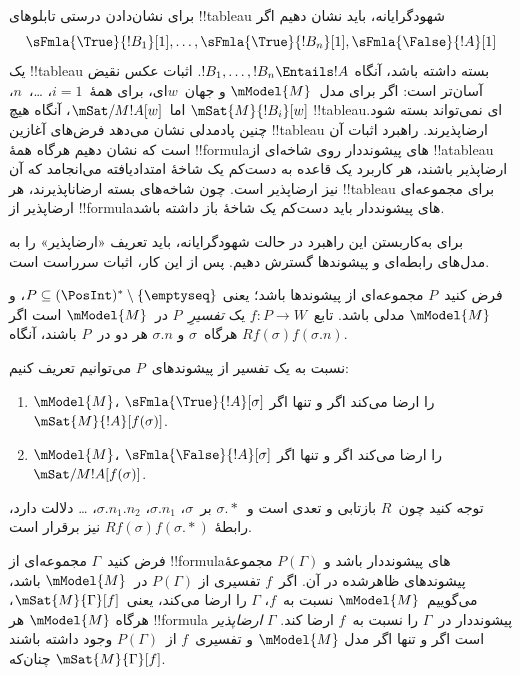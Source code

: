 \documentclass[../../../include/open-logic-section]{subfiles}
\begin{document}


\begin{explain}
  برای نشان‌دادن درستی تابلوهای !!{tableau} شهودگرایانه، باید نشان دهیم
  اگر
  \[
  \sFmla{\True}{!B_1}[1], \dots, \sFmla{\True}{!B_n}[1], \sFmla{\False}{!A}[1]
  \]
  یک !!{tableau} بسته داشته باشد، آنگاه
  $!B_1, \dots, !B_n \Entails !A$. اثبات عکس نقیض آسان‌تر است: اگر برای
  مدل~$\mModel{M}$ و جهان~$w$ای، برای همهٔ~$i=1$، \dots،~$n$،
  $\mSat{M}{!B_i}[w]$ اما~$\mSat/{M}{!A}[w]$، آنگاه هیچ
  !!{tableau}ای نمی‌تواند بسته شود. چنین پادمدلی نشان می‌دهد فرض‌های
  آغازین !!{tableau} ارضاپذیرند. راهبرد اثبات آن است که نشان دهیم هرگاه
  همهٔ !!{formula}های پیشونددار روی شاخه‌ای از !!a{tableau} ارضاپذیر
  باشند، هر کاربرد یک قاعده به دست‌کم یک شاخهٔ امتدادیافته می‌انجامد که
  آن نیز ارضاپذیر است. چون شاخه‌های بسته ارضاناپذیرند، هر !!{tableau}
  برای مجموعه‌ای ارضاپذیر از !!{formula}های پیشونددار باید دست‌کم یک
  شاخهٔ باز داشته باشد.

  برای به‌کاربستن این راهبرد در حالت شهودگرایانه، باید تعریف
  «ارضاپذیر» را به مدل‌های رابطه‌ای و پیشوندها گسترش دهیم. پس از این
  کار، اثبات سرراست است.
\end{explain}

\begin{defn}
  فرض کنید~$P$ مجموعه‌ای از پیشوندها باشد؛ یعنی
  $P \subseteq (\PosInt)^* \setminus \{\emptyseq\}$، و
  $\mModel{M}$ مدلی باشد. تابع~$f\colon P \to W$ یک
  \emph{تفسیرِ}~$P$ در~$\mModel{M}$ است اگر هرگاه~$\sigma$ و
  $\sigma.n$ هر دو در~$P$ باشند، آنگاه
  $Rf(\sigma)f(\sigma.n)$.

  نسبت به یک تفسیر از پیشوندهای~$P$ می‌توانیم تعریف کنیم:
  \begin{enumerate}
  \item $\mModel{M}$، $\sFmla{\True}{!A}[\sigma]$ را ارضا می‌کند اگر
    و تنها اگر~$\mSat{M}{!A}[f(\sigma)]$.
  \item $\mModel{M}$، $\sFmla{\False}{!A}[\sigma]$ را ارضا می‌کند اگر
    و تنها اگر~$\mSat/{M}{!A}[f(\sigma)]$.
  \end{enumerate}
\end{defn}

توجه کنید چون~$R$ بازتابی و تعدی است و~$\sigma.{*}$ بر~$\sigma$،
$\sigma.n_1$، $\sigma.n_1.n_2$، \dots{} دلالت دارد، رابطهٔ
$Rf(\sigma)f(\sigma.{*})$ نیز برقرار است.

\begin{defn}
  فرض کنید~$\Gamma$ مجموعه‌ای از !!{formula}های پیشونددار باشد و
  $P(\Gamma)$ مجموعهٔ پیشوندهای ظاهرشده در آن. اگر~$f$ تفسیری از
  $P(\Gamma)$ در~$\mModel{M}$ باشد، می‌گوییم~$\mModel{M}$ نسبت به~$f$،
  $\Gamma$ را ارضا می‌کند، یعنی~$\mSat{M}{\Gamma}[f]$، هرگاه
  $\mModel{M}$ هر !!{formula} پیشونددار در~$\Gamma$ را نسبت به~$f$
  ارضا کند. $\Gamma$ \emph{ارضاپذیر} است اگر و تنها اگر مدل
  $\mModel{M}$ و تفسیری~$f$ از~$P(\Gamma)$ وجود داشته باشند چنان‌که
  $\mSat{M}{\Gamma}[f]$.
\end{defn}
\end{document}
